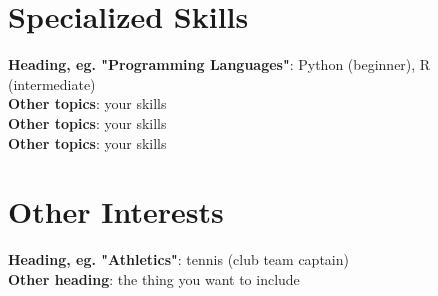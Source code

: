 \documentclass[letterpaper,11pt]{article}
\begin{document}
\section{Specialized Skills}
\begin{itemize}[leftmargin=0.15in, label={}]
    \normalsize{\item{
     \textbf{Heading, eg. "Programming Languages"}{: Python (beginner), R (intermediate)} \\
     \textbf{Other topics}{: your skills}\\
     \textbf{Other topics}{: your skills} \\
     \textbf{Other topics}{: your skills} \\
    }}
 \end{itemize}

\section{Other Interests}
\begin{itemize}[leftmargin=0.15in, label={}]
    \normalsize{\item{
     \textbf{Heading, eg. "Athletics"}{: {tennis (club team captain)} } \\
      \textbf{Other heading}{: {the thing you want to include} } \\
    }}    
 \end{itemize}

\fi
\end{document}
